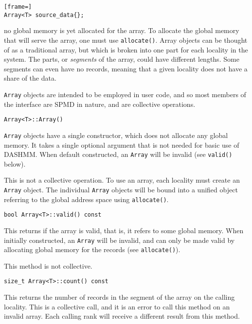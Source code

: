 \begin{lstlisting}[frame=]
Array<T> source_data{};
\end{lstlisting}

\noindent no global memory is yet allocated for the array. To allocate the
global memory that will serve the array, one must use \texttt{allocate()}.
Array objects can be thought of as a traditional array,
but which is broken into one part for each locality in the system. The parts,
or \emph{segments} of the array, could have different lengths. Some segments can
even have no records, meaning that a given locality does not have a share of
the data.

\texttt{Array} objects are intended to be employed in user code, and so most
members of the interface are SPMD in nature, and are collective operations.

\begin{lstlisting}
Array<T>::Array()
\end{lstlisting}

\noindent \texttt{Array} objects have a single constructor, which does not
allocate any
global memory. It takes a single optional argument that is not needed for basic
use of DASHMM. When default constructed, an \texttt{Array} will be invalid (see
\texttt{valid()} below).

This is not a collective operation. To use an array, each locality must create
an \texttt{Array} object. The individual \texttt{Array} objects will be bound
into a unified object referring to the global address space using
\texttt{allocate()}.

\begin{lstlisting}
bool Array<T>::valid() const
\end{lstlisting}

\noindent This returns if the array is valid, that is, it refers to some global
memory.
When initially constructed, an \texttt{Array} will be invalid, and can only be
made valid by allocating global memory for the records (see
\texttt{allocate()}).

This method is not collective.

\begin{lstlisting}
size_t Array<T>::count() const
\end{lstlisting}

\noindent This returns the number of records in the segment of the array on the
calling
locality. This is a collective call, and it is an error to call this method
on an invalid array. Each calling rank will receive a different result from
this method.

